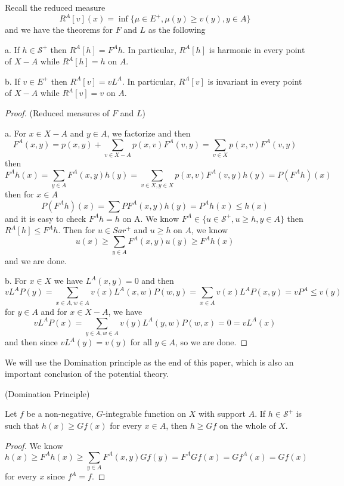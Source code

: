 \documentclass[lang=en,11pt,a4paper,citestyle =authoryear]{elegantpaper}
\newcommand{\Sar}{\mathcal{S}}
\begin{document}
Recall the reduced measure
   \[R^A[v] (x) = \inf\{\mu\in E^+, \mu(y)\geq v(y), y\in A\}\]
and we have the theorems for $F$ and $L$ as the following

\begin{theorem}
    a. If $h\in \Sar^+$ then $R^A[h] = F^Ah$. In particular, $R^A[h]$ is harmonic in every point of $X-A$ while $R^A[h] = h$ on $A$.\par
    b. If $v\in E^+$ then $R^A[v] = vL^A$. In particular, $R^A[v]$ is invariant in every point of $X-A$ while $R^A[v] = v$ on $A$.
\end{theorem}
\begin{proof}(Reduced measures of $F$ and $L$)\par
    a. For $x\in X-A$ and $y\in A$, we factorize and then
    \[
    F^A(x,y) = p(x,y) + \sum\limits_{v\in X-A} p(x,v)F^A(v,y) = \sum_{v\in X} p(x,v)F^A(v,y)
    \]
    then
    \[
    F^Ah(x) = \sum\limits_{y\in A}F^A(x,y)h(y) = \sum\limits_{v\in X,y\in X} p(x,v)F^A(v,y)h(y) = P(F^A h)(x)
    \]
    then for $x\in A$
    \[
    P(F^Ah)(x) = \sum PF^A(x,y)h(y) = P^Ah(x) \leq h(x)
    \]
    and it is easy to check $F^Ah = h$ on A. We know $F^A \in \{u\in \Sar^+, u\geq h, y\in A\}$ then $R^A[h] \leq F^A h$. Then for $u \in Sar^+$ and $u\geq h$ on $A$, we know
    \[
    u(x) \geq \sum_{y\in A}F^A(x,y)u(y) \geq F^Ah(x)
    \]
    and we are done.\par
    b. For $x\in X$ we have $L^A(x,y) = 0$ and then
    \[
    vL^AP(y) = \sum\limits_{x\in A,w\in A}v(x)L^A(x,w)P(w,y) = \sum\limits_{x\in A}v(x)L^AP(x,y) = vP^A \leq v(y)
    \]
    for $y \in A$ and for $x\in X-A$, we have
    \[
    vL^AP(x) = \sum\limits_{y\in A,w\in A}v(y)L^A(y,w)P(w,x) = 0 = vL^A(x)
    \]
    and then since $vL^A(y) = v(y)$ for all $y\in A$, so we are done.\par
\end{proof}

We will use the Domination principle as the end of this paper, which is also an important conclusion of the potential theory.

\begin{theorem}
    (Domination Principle)\par
    Let $f$ be a non-negative, $G$-integrable function on $X$ with support $A$. If $h\in \Sar^+$ is such that $h(x) \geq Gf(x)$ for every $x\in A$, then $h\geq Gf$ on the whole of $X$.
\end{theorem}
\begin{proof}
    We know
    \[
    h(x) \geq F^Ah(x) \geq \sum\limits_{y\in A}F^A(x,y)Gf(y) = F^AGf(x) = Gf^A(x) = Gf(x) 
    \]
    for every $x$ since $f^A = f$.
\end{proof}
\end{document}
